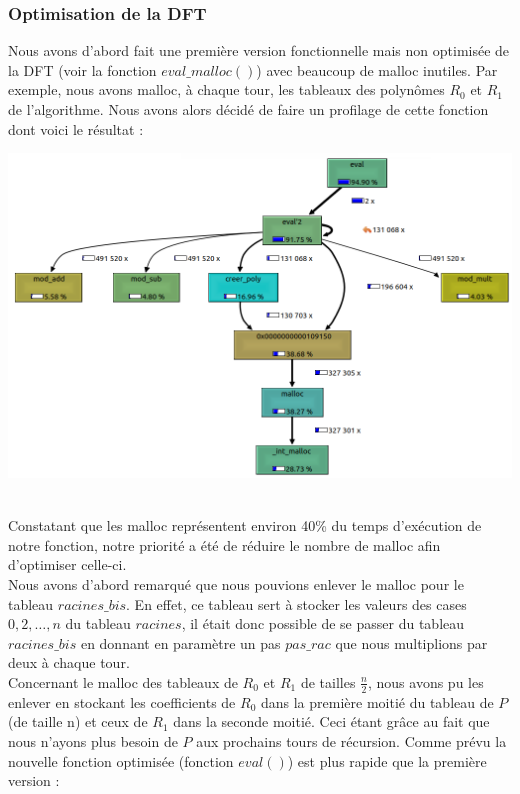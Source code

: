 \documentclass[12pt, a4paper]{article}
\begin{document}
\subsubsection{Optimisation de la DFT}
Nous avons d'abord fait une première version fonctionnelle mais non optimisée de la DFT (voir la fonction $eval\_malloc()$) avec beaucoup de malloc inutiles. Par exemple, nous avons malloc, à chaque tour, les tableaux des polynômes $R_0$ et $R_1$ de l'algorithme. Nous avons alors décidé de faire un profilage de cette fonction dont voici le résultat : \\
\centerline{\includegraphics[scale=0.7]{profiler_eval_malloc}}
\ \\
\indent Constatant que les malloc représentent environ 40\% du temps d'exécution de notre fonction, notre priorité a été de réduire le nombre de malloc afin d'optimiser celle-ci.  \\
\indent Nous avons d'abord remarqué que nous pouvions enlever le malloc pour le tableau \linebreak $racines\_bis$. En effet, ce tableau sert à stocker les valeurs des cases $0,2,\dots,n$ du tableau $racines$, il était donc possible de se passer du tableau $racines\_bis$ en donnant en paramètre un pas $pas\_rac$ que nous multiplions par deux à chaque tour. \\
\indent Concernant le malloc des tableaux de $R_0$ et $R_1$ de tailles $\frac{n}{2}$, nous avons pu les enlever en stockant les coefficients de $R_0$ dans la première moitié du tableau de $P$ (de taille n) et ceux de $R_1$ dans la seconde moitié. Ceci étant grâce au fait que nous n'ayons plus besoin de $P$ aux prochains tours de récursion.
Comme prévu la nouvelle fonction optimisée (fonction $eval()$) est plus rapide que la première version :
\end{document}
